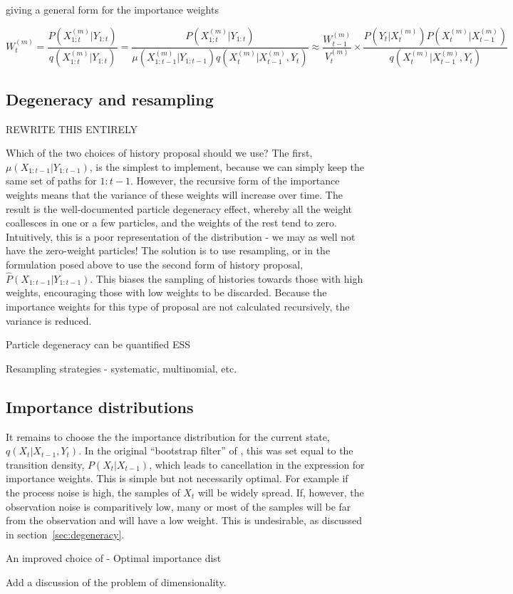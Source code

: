 giving a general form for the importance weights

\begin{equation}
W_t^{(m)} = \frac{P(X_{1:t}^{(m)}|Y_{1:t})}{q(X_{1:t}^{(m)}|Y_{1:t})} = \frac{P(X_{1:t}^{(m)}|Y_{1:t})}{\mu(X_{1:t-1}^{(m)}|Y_{1:t-1}) q(X_{t}^{(m)}|X_{t-1}^{(m)}, Y_{t})} \approx \frac{W_{t-1}^{(m)}}{V_{t}^{(m)}} \times \frac{ P(Y_t|X_t^{(m)})P(X_t^{(m)}|X_{t-1}^{(m)})}{q(X_t^{(m)}|X_{t-1}^{(m)}, Y_t)}
\label{eq:NoResampIW}
\end{equation}


\subsection{Degeneracy and resampling}

REWRITE THIS ENTIRELY

Which of the two choices of history proposal should we use? The first, $\mu(X_{1:t-1}|Y_{1:t-1})$, is the simplest to implement, because we can simply keep the same set of paths for $1:t-1$. However, the recursive form of the importance weights means that the variance of these weights will increase over time. The result is the well-documented particle degeneracy effect, whereby all the weight coallesces in one or a few particles, and the weights of the rest tend to zero. Intuitively, this is a poor representation of the distribution - we may as well not have the zero-weight particles! The solution is to use resampling, or in the formulation posed above to use the second form of history proposal, $\hat{P}(X_{1:t-1}|Y_{1:t-1})$. This biases the sampling of histories towards those with high weights, encouraging those with low weights to be discarded. Because the importance weights for this type of proposal are not calculated recursively, the variance is reduced.

Particle degeneracy can be quantified     ESS

Resampling strategies - systematic, multinomial, etc.



\subsection{Importance distributions}

It remains to choose the the importance distribution for the current state, $q(X_{t}|X_{t-1}, Y_{t})$. In the original ``bootstrap filter'' of \cite{Gordon1993}, this was set equal to the transition density, $P(X_t|X_{t-1})$, which leads to cancellation in the expression for importance weights. This is simple but not necessarily optimal. For example if the process noise is high, the samples of $X_t$ will be widely spread. If, however, the observation noise is comparitively low, many or most of the samples will be far from the observation and will have a low weight. This is undesirable, as discussed in section~\ref{sec:degeneracy}.

An improved choice of  - Optimal importance dist


Add a discussion of the problem of dimensionality.
